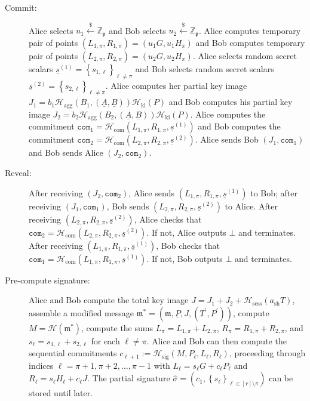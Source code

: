 \documentclass{iacrtrans}
\theoremstyle{definition}
\numberwithin{theorem}{subsection}
\numberwithin{lemma}{theorem}
\newcommand{\p}{\mathfrak{p}}
\newcommand{\m}{\mathfrak{m}}
\newcommand{\bbz}{\mathbb{Z}}
\begin{document}
\begin{description}
\item [Commit:] Alice selects $u_1 \overset{\$}{\leftarrow} \bbz_\p$ and Bob selects $u_2 \overset{\$}{\leftarrow} \bbz_\p$. Alice computes temporary pair of points $(L_{1, \pi}, R_{1,\pi}) = (u_1 G, u_1 H_\pi)$ and Bob computes temporary pair of points $(L_{2, \pi}, R_{2,\pi}) = (u_2 G, u_2 H_\pi)$. Alice selects random secret scalars $\underline{s}^{(1)} = \left\{s_{1, \ell}\right\}_{\ell \neq \pi}$ and Bob selects random secret scalars $\underline{s}^{(2)} = \left\{s_{2,\ell}\right\}_{\ell \neq \pi}$. Alice computes her partial key image $J_1 = b_1 \mathcal{H}_{\text{agg}}(B_1, (\underline{A}, \underline{B}))\mathcal{H}_{\text{ki}}(P)$ and Bob computes his partial key image $J_2 = b_2 \mathcal{H}_{\text{agg}}(B_2, (\underline{A}, \underline{B}))\mathcal{H}_{\text{ki}}(P)$. Alice computes the commitment $\texttt{com}_1 = \mathcal{H}_{\text{com}}(L_{1,\pi}, R_{1,\pi}, \underline{s}^{(1)})$ and Bob computes the commitment  $\texttt{com}_2 = \mathcal{H}_{\text{com}}(L_{2,\pi}, R_{2,\pi}, \underline{s}^{(2)})$. Alice sends Bob $(J_1, \texttt{com}_1)$ and Bob sends Alice $(J_2,\texttt{com}_2)$.

\item [Reveal:] After receiving $(J_2, \texttt{com}_2)$, Alice sends $(L_{1,\pi}, R_{1,\pi}, \underline{s}^{(1)})$ to Bob; after receiving $(J_1, \texttt{com}_1)$, Bob sends $(L_{2,\pi}, R_{2,\pi}, \underline{s}^{(2)})$ to Alice. After receiving  $(L_{2,\pi}, R_{2,\pi}, \underline{s}^{(2)})$, Alice checks that $\texttt{com}_2 = \mathcal{H}_{\text{com}}(L_{2,\pi}, R_{2,\pi}, \underline{s}^{(2)})$. If not, Alice outputs $\bot$ and terminates. After receiving $(L_{1,\pi}, R_{1,\pi}, \underline{s}^{(1)})$, Bob checks that $\texttt{com}_1 = \mathcal{H}_{\text{com}}(L_{1,\pi}, R_{1,\pi}, \underline{s}^{(1)})$. If not, Bob outputs $\bot$ and terminates.

\item [Pre-compute signature:] Alice and Bob compute the total key image $J = J_1 + J_2 + \mathcal{H}_{\text{sess}}(a_{\text{sh}}T)$, assemble a modified message $\m^* = (\m, \underline{P}, J, (T^{\prime}, P^{\prime}))$, compute $M = \mathcal{H}(\m^*)$, compute the sums $L_\pi = L_{1,\pi} + L_{2,\pi}$, $R_\pi = R_{1,\pi} + R_{2,\pi}$, and $s_\ell = s_{1,\ell} + s_{2, \ell}$ for each $\ell \neq \pi$. Alice and Bob can then compute the sequential commitments $c_{\ell+1} := \mathcal{H}_{\text{sig}}(M,P_\ell, L_{\ell}, R_{\ell})$, proceeding through indices $\ell=\pi+1, \pi+2, \ldots, \pi-1$ with $L_\ell = s_\ell G + c_\ell P_\ell$ and $R_\ell = s_\ell H_\ell + c_\ell J$.   The partial signature $\widehat{\sigma} = (c_1, \left\{s_\ell\right\}_{\ell \in [r] \setminus \pi})$ can be stored until later.


\end{description}
\end{document}

